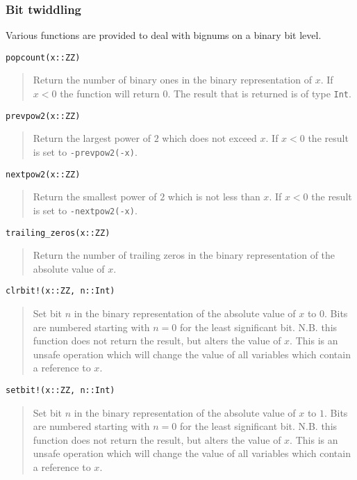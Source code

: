 \documentclass[a4paper,10pt]{article}
\newcommand{\code}{\lstinline}
\newcommand{\desc}[1]{\vspace{-3mm}\begin{quote}#1\end{quote}}
\begin{document}
{{{\subsubsection{Bit twiddling}

Various functions are provided to deal with bignums on a binary bit level.

\begin{lstlisting}
popcount(x::ZZ)
\end{lstlisting}

\desc{Return the number of binary ones in the binary representation of $x$. If $x < 0$ the
function will return $0$. The result that is returned is of type \code{Int}.}

\begin{lstlisting}
prevpow2(x::ZZ)
\end{lstlisting}

\desc{Return the largest power of $2$ which does not exceed $x$. If $x < 0$ the result is
set to \code{-prevpow2(-x)}.}

\begin{lstlisting}
nextpow2(x::ZZ)
\end{lstlisting}

\desc{Return the smallest power of $2$ which is not less than $x$. If $x < 0$ the result is
set to \code{-nextpow2(-x)}.}

\begin{lstlisting}
trailing_zeros(x::ZZ)
\end{lstlisting}

\desc{Return the number of trailing zeros in the binary representation of the absolute
value of $x$.}

\begin{lstlisting}
clrbit!(x::ZZ, n::Int)
\end{lstlisting}

\desc{Set bit $n$ in the binary representation of the absolute value of $x$ to $0$. Bits
are numbered starting with $n = 0$ for the least significant bit. N.B. this function does
not return the result, but alters the value of $x$. This is an unsafe operation which will
change the value of all variables which contain a reference to $x$.}

\begin{lstlisting}
setbit!(x::ZZ, n::Int)
\end{lstlisting}

\desc{Set bit $n$ in the binary representation of the absolute value of $x$ to $1$. Bits
are numbered starting with $n = 0$ for the least significant bit. N.B. this function does
not return the result, but alters the value of $x$. This is an unsafe operation which will
change the value of all variables which contain a reference to $x$.}

}}}
\end{document}
